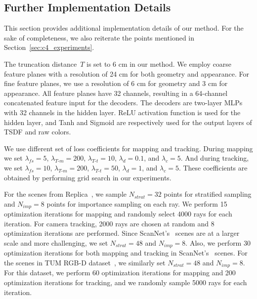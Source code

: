 \subsection{Further Implementation Details} \label{sec:c4_supp_details}
This section provides additional implementation details of our method. For the sake of completeness, we also reiterate the points mentioned in Section~\ref{sec:c4_experiments}.

The truncation distance~$T$ is set to 6 cm in our method. We employ coarse feature planes with a resolution of 24 cm for both geometry and appearance. For fine feature planes, we use a resolution of 6 cm for geometry and 3 cm for appearance. All feature planes have 32 channels, resulting in a 64-channel concatenated feature input for the decoders. The decoders are two-layer MLPs with 32 channels in the hidden layer. ReLU activation function is used for the hidden layer, and Tanh and Sigmoid are respectively used for the output layers of TSDF and raw colors.

We use different set of loss coefficients for mapping and tracking. During mapping we set $\lambda_{fs}=5$, $\lambda_{T\text{-}m}=200$, $\lambda_{T\text{-}t}=10$, $\lambda_{d}=0.1$, and $\lambda_{c}=5$. And during tracking, we set $\lambda_{fs}=10$, $\lambda_{T\text{-}m}=200$, $\lambda_{T\text{-}t}=50$, $\lambda_{d}=1$, and $\lambda_{c}=5$. These coefficients are obtained by performing grid search in our experiments.

For the scenes from Replica~\citep{replica19arxiv}, we sample $N_{strat}=32$ points for stratified sampling and $N_{imp}=8$ points for importance sampling on each ray. We perform 15 optimization iterations for mapping and randomly select 4000 rays for each iteration. For camera tracking, 2000 rays are chosen at random and 8 optimization iterations are performed. Since ScanNet's~\citep{dai2017scannet} scenes are at a larger scale and more challenging, we set $N_{strat}=48$ and $N_{imp}=8$. Also, we perform 30 optimization iterations for both mapping and tracking in ScanNet's~\citep{dai2017scannet} scenes. For the scenes in TUM RGB-D dataset~\citep{sturm2012benchmark}, we similarly set $N_{strat}=48$ and $N_{imp}=8$. For this dataset, we perform 60 optimization iterations for mapping and 200 optimization iterations for tracking, and we randomly sample 5000 rays for each iteration.

